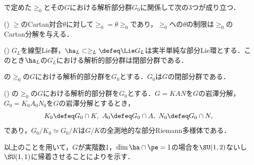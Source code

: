 で定めた$\ge_0$とその$G$における解析部分群$G_0$に関係して次の3つが成り立つ．
\begin{lem}(\cite[p.~409, Lemma~2.2]{hel01})
  $\ge$のCartan対合$\theta$に対して$\ge_0 = \theta\ge_0$であり，$\ge_0 $への$\theta$の制限は$\ge_0$のCartan分解を与える．
\end{lem}

\begin{thm}\label{thm:yos38}(\cite[p.~82]{yos38})
  $G_L$を線型Lie群，$\ha_{L} \subset \ge_{L}\defeq \Lie G_{L} $は実半単純な部分Lie環とする．このとき$\ha_{L} $の$G_{L} $における解析的部分群は閉部分群である．
\end{thm}
\begin{cor}
  の$\ge_0$の$G$における解析的部分群を$G_0$とする．$G_0 $は$G$の閉部分群である．
\end{cor}


\begin{lem}(\cite[p.~409, Lemma~2.3]{hel01}) の$\ge_0$の$G$における解析的部分群を$G_0$とする．$G = KAN$を$G$の岩澤分解，$G_0 = K_0A_0N_0$を$G$の岩澤分解とするとき，
  \begin{align*}
    K_0\defeq G_0\cap K,\ A_0 \defeq G_0\cap A,\ N_0\defeq G_0\cap N, 
  \end{align*}
  であり，$G_0/K_0 \simeq G_0/K$は$G/K$の全測地的な部分Riemann多様体である．
  
\end{lem}

以上のことを用いて，$G$が実階数1，$\dim \ha\cap\pe = 1 $の場合を$\SU(1,2) $ないし$\SU(1,1) $に帰着させることによりを示す．

